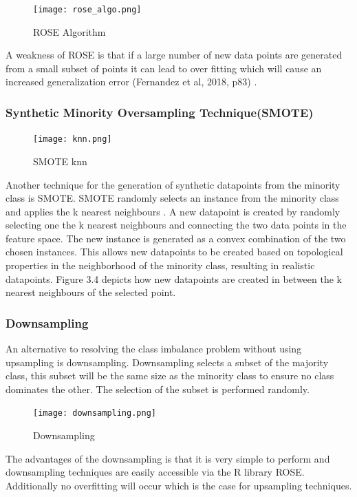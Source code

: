 \begin{figure}[h]
\centering
\texttt{[image: rose\_algo.png]}
\caption{ROSE Algorithm}
\end{figure}

A weakness of ROSE is that if a large number of new data points are generated from a small subset of points it can lead to over fitting which will cause an increased generalization error (Fernandez et al, 2018, p83) \cite{Fernandez}. 

\subsubsection{Synthetic Minority Oversampling Technique(SMOTE)} 

\begin{figure}[h]
\centering
\texttt{[image: knn.png]}
\caption{SMOTE knn}
\end{figure}

Another technique for the generation of synthetic datapoints from the minority class is SMOTE. SMOTE randomly selects an instance from the minority class and applies the k nearest neighbours \cite{smotefamily}. A new datapoint is created by randomly selecting one the k nearest neighbours and connecting the two data points in the feature space. The new instance is generated as a convex combination of the two chosen instances. This allows new datapoints to be created based on topological properties in the neighborhood of the minority class, resulting in realistic datapoints. Figure 3.4 depicts how new datapoints are created in between the k nearest neighbours of the selected point.

\subsubsection{Downsampling}
An alternative to resolving the class imbalance problem without using upsampling is downsampling. Downsampling selects a subset of the majority class, this subset will be the same size as the minority class to ensure no class dominates the other. The selection of the subset is performed randomly.

\begin{figure}[h]
\centering
\texttt{[image: downsampling.png]}
\caption{Downsampling}
\end{figure}

The advantages of the downsampling is that it is very simple to perform and downsampling techniques are easily accessible via the R library ROSE. Additionally no overfitting will occur which is the case for upsampling techniques.

